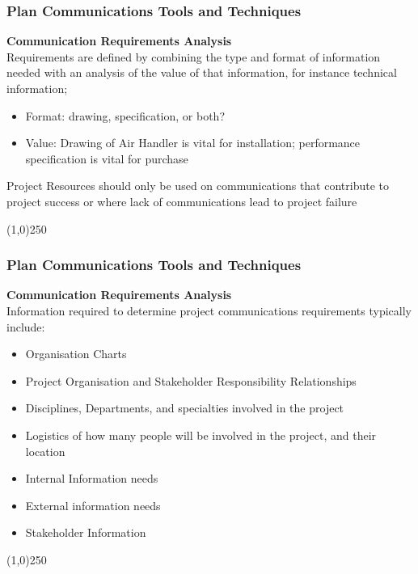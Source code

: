\begin{frame}
\frametitle{Plan Communications \hfill\hfill Tools and Techniques}
\textbf{Communication Requirements Analysis}\\
Requirements are defined by combining the type and format of information needed with an analysis of the value of that information, for instance technical information;
\begin{itemize}
	\item Format: drawing, specification, or both?
	\item Value: Drawing of Air Handler is vital for installation; performance specification is vital for purchase
\end{itemize}
Project Resources should only be used on communications that contribute to project success or where lack of communications lead to project failure
\end{frame}\begin{center}\line(1,0){250}\end{center}


\begin{frame}
\frametitle{Plan Communications \hfill\hfill Tools and Techniques}
\textbf{Communication Requirements Analysis}\\
Information required to determine project communications requirements typically include:
\begin{itemize}
	\item Organisation Charts
	\item Project Organisation and Stakeholder Responsibility Relationships
	\item Disciplines, Departments, and specialties involved in the project
	\item Logistics of how many people will be involved in the project, and their location
	\item Internal Information needs
	\item External information needs
	\item Stakeholder Information
\end{itemize}
\end{frame}\begin{center}\line(1,0){250}\end{center}


